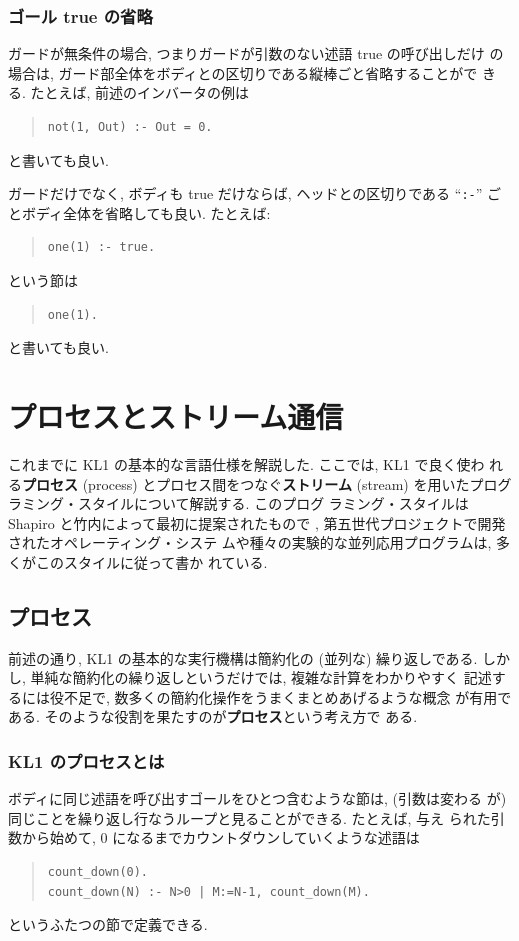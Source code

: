 \documentclass[a4,titlepage]{jsreport}
\def\em{\bf\dg}
\let\dg\bf
\newenvironment{program}{\begin{quote}}{\end{quote}}
\begin{document}
\subsubsection{ゴール true の省略}
ガードが無条件の場合, つまりガードが引数のない述語 true の呼び出しだけ
の場合は, ガード部全体をボディとの区切りである縦棒ごと省略することがで
きる.  たとえば, 前述のインバータの例は
\begin{program}
\begin{verbatim}
not(1, Out) :- Out = 0.
\end{verbatim}
\end{program}
と書いても良い.

ガードだけでなく, ボディも true だけならば, ヘッドとの区切りである 
``{\verb|:-|}'' ごとボディ全体を省略しても良い.  たとえば:
\begin{program}
\begin{verbatim}
one(1) :- true.
\end{verbatim}
\end{program}
という節は
\begin{program}
\begin{verbatim}
one(1).
\end{verbatim}
\end{program}
と書いても良い.

\section{プロセスとストリーム通信}
これまでに KL1 の基本的な言語仕様を解説した.  ここでは, KL1 で良く使わ
れる{\em プロセス} (process) とプロセス間をつなぐ{\em ストリーム}
(stream) を用いたプログラミング・スタイルについて解説する.  このプログ
ラミング・スタイルは Shapiro と竹内によって最初に提案されたもので
\cite{OOCP}, 第五世代プロジェクトで開発されたオペレーティング・システ
ムや種々の実験的な並列応用プログラムは, 多くがこのスタイルに従って書か
れている.

\subsection{プロセス}
前述の通り, KL1 の基本的な実行機構は簡約化の (並列な) 繰り返しである.
しかし, 単純な簡約化の繰り返しというだけでは, 複雑な計算をわかりやすく
記述するには役不足で, 数多くの簡約化操作をうまくまとめあげるような概念
が有用である.  そのような役割を果たすのが{\em プロセス}という考え方で
ある.

\subsubsection{KL1 のプロセスとは}
ボディに同じ述語を呼び出すゴールをひとつ含むような節は, (引数は変わる
が) 同じことを繰り返し行なうループと見ることができる.  たとえば, 与え
られた引数から始めて, 0 になるまでカウントダウンしていくような述語は
\begin{program}
\begin{Verbatim}[baselinestretch=0.8]
count_down(0).
count_down(N) :- N>0 | M:=N-1, count_down(M).
\end{Verbatim}
\end{program}
というふたつの節で定義できる.
\end{document}
